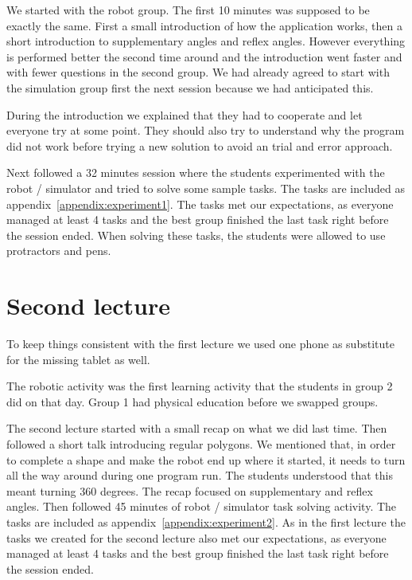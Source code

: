 \bigskip\noindent
We started with the robot group. The first 10 minutes was supposed to be exactly the same. First a small introduction of how the application works, then a short introduction to supplementary angles and reflex angles. However everything is performed better the second time around and the introduction went faster and with fewer questions in the second group. We had already agreed to start with the simulation group first the next session because we had anticipated this.

\bigskip\noindent
During the introduction we explained that they had to cooperate and let everyone try at some point. They should also try to understand why the program did not work before trying a new solution to avoid an trial and error approach.

\bigskip\noindent
Next followed a 32 minutes session where the students experimented with the robot / simulator and tried to solve some sample tasks. The tasks are included as appendix~\ref{appendix:experiment1}.
The tasks met our expectations, as everyone managed at least 4 tasks and the best group finished the last task right before the session ended. When solving these tasks, the students were allowed to use protractors and pens. 

\section{Second lecture}
To keep things consistent with the first lecture we used one phone as substitute for the missing tablet as well.

\bigskip\noindent
The robotic activity was the first learning activity that the students in group 2 did on that day. 
Group 1 had physical education before we swapped groups.

\bigskip\noindent
The second lecture started with a small recap on what we did last time. Then followed a short talk introducing regular polygons. We mentioned that, in order to complete a shape and make the robot end up where it started, it needs to turn all the way around during one program run. The students understood that this meant turning 360 degrees. The recap focused on supplementary and reflex angles. Then followed 45 minutes of robot / simulator task solving activity. The tasks are included as appendix~\ref{appendix:experiment2}.
As in the first lecture the tasks we created for the second lecture also met our expectations, as everyone managed at least 4 tasks and the best group finished the last task right before the session ended. 